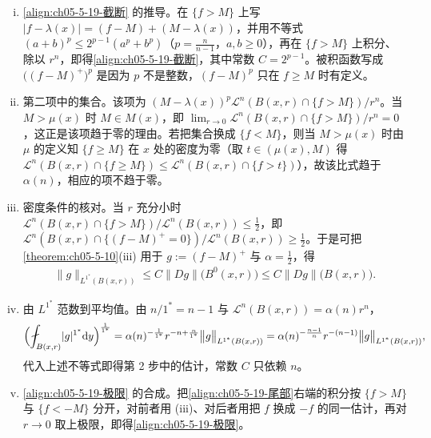 \documentclass[../../main.tex]{subfiles}%
\begin{document}
\begin{remark}\label{remark:ch05-thm-5-19-论证二}
\begin{enumerate}[(i)]
\item \eqref{align:ch05-5-19-截断} 的推导。在 $\{f>M\}$ 上写 $\lvert f-\lambda(x)\rvert=(f-M)+(M-\lambda(x))$，并用不等式 $(a+b)^{p}\leqslant2^{p-1}(a^{p}+b^{p})$（$p=\frac{n}{n-1}$，$a,b\geqslant0$），再在 $\{f>M\}$ 上积分、除以 $r^n$，即得\eqref{align:ch05-5-19-截断}，其中常数 $C=2^{p-1}$。被积函数写成 $\bigl((f-M)^{+}\bigr)^{p}$ 是因为 $p$ 不是整数，$(f-M)^{p}$ 只在 $f\geqslant M$ 时有定义。
\item 第二项中的集合。该项为 $(M-\lambda(x))^{p}\mathcal{L}^n(B(x,r)\cap\{f>M\})/r^n$。当 $M>\mu(x)$ 时 $M\in M(x)$，即 $\lim_{r\to0}\mathcal{L}^n(B(x,r)\cap\{f>M\})/r^n=0$，这正是该项趋于零的理由。若把集合换成 $\{f<M\}$，则当 $M>\mu(x)$ 时由 $\mu$ 的定义知 $\{f\geqslant M\}$ 在 $x$ 处的密度为零（取 $t\in(\mu(x),M)$ 得 $\mathcal{L}^n(B(x,r)\cap\{f\geqslant M\})\leqslant\mathcal{L}^n(B(x,r)\cap\{f>t\})$），故该比式趋于 $\alpha(n)$，相应的项不趋于零。
\item 密度条件的核对。当 $r$ 充分小时 $\mathcal{L}^n(B(x,r)\cap\{f>M\})/\mathcal{L}^n(B(x,r))\leqslant\frac12$，即 $\mathcal{L}^n(B(x,r)\cap\{(f-M)^{+}=0\})/\mathcal{L}^n(B(x,r))\geqslant\frac12$。于是可把\cref{theorem:ch05-5-10}(iii) 用于 $g:=(f-M)^{+}$ 与 $\alpha=\frac12$，得%
\begin{align*}
\bigl\lVert g\bigr\rVert_{L^{1^{*}}(B(x,r))}\leqslant C\bigl\lVert Dg\bigr\rVert\bigl(B^0(x,r)\bigr)\leqslant C\bigl\lVert Dg\bigr\rVert\bigl(B(x,r)\bigr).
\end{align*}
\item 由 $L^{1^{*}}$ 范数到平均值。由 $n/1^{*}=n-1$ 与 $\mathcal{L}^n(B(x,r))=\alpha(n)r^n$，
\begin{align*}
\Bigl(\fint_{B(x,r)}\lvert g\rvert^{1^{*}}\diff y\Bigr)^{\frac{1}{1^{*}}}
=\alpha(n)^{-\frac{1}{1^{*}}}r^{-n+\frac{n}{1^{*}}}\bigl\lVert g\bigr\rVert_{L^{1^{*}}(B(x,r))}
=\alpha(n)^{-\frac{n-1}{n}}r^{-(n-1)}\bigl\lVert g\bigr\rVert_{L^{1^{*}}(B(x,r))},
\end{align*}
代入上述不等式即得第 2 步中的估计，常数 $C$ 只依赖 $n$。
\item \eqref{align:ch05-5-19-极限} 的合成。把\eqref{align:ch05-5-19-尾部}右端的积分按 $\{f>M\}$ 与 $\{f<-M\}$ 分开，对前者用 (iii)、对后者用把 $f$ 换成 $-f$ 的同一估计，再对 $r\to0$ 取上极限，即得\eqref{align:ch05-5-19-极限}。

\end{enumerate}
\end{remark}
\end{document}
